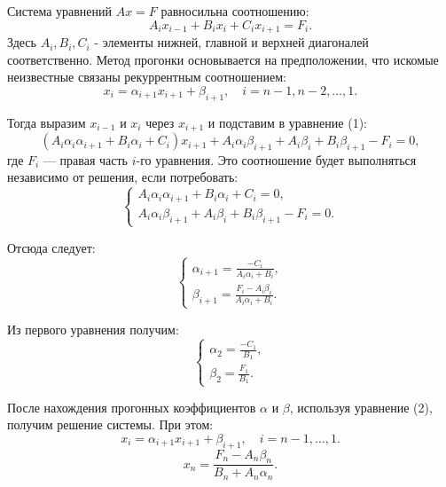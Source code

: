 \documentclass{article}
\begin{document}
Система уравнений \( Ax = F \) равносильна соотношению:
\begin{equation}
    A_i x_{i-1} + B_i x_i + C_i x_{i+1} = F_i.
\end{equation}
Здесь $A_i, B_i, C_i$ - элементы нижней, главной и верхней диагоналей соответственно.
Метод прогонки основывается на предположении, что искомые неизвестные связаны рекуррентным соотношением:
\begin{equation}
    x_i = \alpha_{i+1} x_{i+1} + \beta_{i+1}, \quad i = n-1, n-2, \dots, 1.
\end{equation}

Тогда выразим \( x_{i-1} \) и \( x_i \) через \( x_{i+1} \) и подставим в уравнение (1):
\begin{equation}
    (A_i \alpha_i \alpha_{i+1} + B_i \alpha_i + C_i) x_{i+1} + A_i \alpha_i \beta_{i+1} + A_i \beta_i + B_i \beta_{i+1} - F_i = 0,
\end{equation}
где \( F_i \) — правая часть \( i \)-го уравнения. Это соотношение будет выполняться независимо от решения, если потребовать:
\begin{equation}
    \begin{cases}
        A_i \alpha_i \alpha_{i+1} + B_i \alpha_i + C_i = 0, \\
        A_i \alpha_i \beta_{i+1} + A_i \beta_i + B_i \beta_{i+1} - F_i = 0.
    \end{cases}
\end{equation}

Отсюда следует:
\begin{equation}
    \begin{cases}
        \alpha_{i+1} = \frac{-C_i}{A_i \alpha_i + B_i}, \\
        \beta_{i+1} = \frac{F_i - A_i \beta_i}{A_i \alpha_i + B_i}.
    \end{cases}
\end{equation}

Из первого уравнения получим:
\begin{equation}
    \begin{cases}
        \alpha_2 = \frac{-C_1}{B_1}, \\
        \beta_2 = \frac{F_1}{B_1}.
    \end{cases}
\end{equation}

После нахождения прогонных коэффициентов \( \alpha \) и \( \beta \), используя уравнение (2), получим решение системы. При этом:
\begin{equation}
    x_i = \alpha_{i+1} x_{i+1} + \beta_{i+1}, \quad i = n-1, \dots, 1.
\end{equation}
\begin{equation}
    x_n = \frac{F_n - A_n \beta_n}{B_n + A_n \alpha_n}.
\end{equation}
\end{document}

